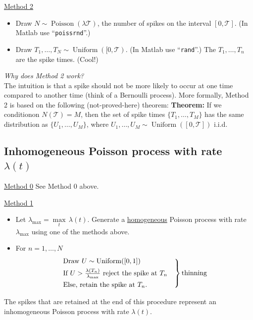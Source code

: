 \documentclass[11pt]{article}
\DeclareMathOperator{\Poisson}{Poisson}
\DeclareMathOperator{\Uniform}{Uniform}
\newenvironment{propertybox}{%
   \def\FrameCommand{\colorbox{LightSteelBlue}}%
   \MakeFramed{\advance\hsize-\width \FrameRestore}}
 {\endMakeFramed}
\begin{document}
\underline{Method 2}
\begin{itemize}
\item Draw $N \sim \Poisson(\lambda \mathcal{T})$, the number of spikes on the interval $[0, \mathcal{T}]$. (In {\sc Matlab} 
use ``{\tt poissrnd}''.)
\item Draw $T_1, \ldots, T_N \sim \Uniform([0, \mathcal{T})$. (In  {\sc Matlab} use ``{\tt rand}''.) The $T_1, \ldots, T_n$ are
the spike times. (Cool!)
\end{itemize}
\begin{framed}
\emph{Why does Method 2 work?} \\
The intuition is that a spike should not be more likely to occur at one time compared to another time (think of a Bernoulli process).
More formally, Method 2 is based on the following (not-proved-here) theorem:
\begin{propertybox}
{\bf Theorem:} If we conditionon $N(\mathcal{T}) = M$, then the set of spike times $\lbrace T_1,\ldots,T_M\rbrace$ has the
same distribution as $\lbrace U_1,\ldots,U_M\rbrace$, where $U_1, \ldots, U_M \sim \Uniform\left([0, \mathcal{T}]\right)$ i.i.d.
\end{propertybox}
\end{framed}

\subsection{Inhomogeneous Poisson process with rate $\lambda (t)$}
\underline{Method 0}
See Method 0 above.

\underline{Method 1}
\begin{itemize}
\item Let $\lambda_{\max} = \underset{t}{\max} \, \lambda(t)$. Generate a \underline{homogeneous} Poisson process with rate
$\lambda_{\max}$ using one of the methods above.
\item For $n = 1, \ldots, N$
\begin{equation*}
\begin{rcases} \text{Draw } U \sim \Uniform([0, 1]) \\ \text{If } U > \frac{\lambda(T_n)}{\lambda_{\max}} 
   \text{ reject the spike at } T_n \quad \\ \text{Else, retain the spike at } T_n.\end{rcases} \text{thinning} 
\end{equation*}
\end{itemize}
The spikes that are retained at the end of this procedure represent an inhomogeneous Poisson process with rate $\lambda(t)$.
\end{document}
